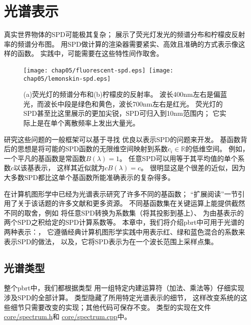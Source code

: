\section{光谱表示}\label{sec:光谱表示}

真实世界物体的SPD可能极其复杂；
展示了荧光灯发光的频谱分布和柠檬皮反射率的频谱分布图。
用SPD做计算的渲染器需要紧实、高效且准确的方式表示像这样的函数。
实践中，可能需要在这些特性间作取舍。
\begin{figure}[htbp]
    \centering
    \texttt{[image: chap05/fluorescent-spd.eps]}\,\nolinebreak
    \texttt{[image: chap05/lemonskin-spd.eps]}
    \caption{(a)荧光灯的频谱分布和(b)柠檬皮的反射率。
    波长400nm左右是偏蓝光，而波长中段是绿色和黄色，波长700nm左右是红光。
    荧光灯的SPD甚至比这里展示的更加尖锐，SPD可归入到10nm范围内；
    它实际上是在单个离散频率上发出大量光。}
    \label{fig:5.1}
\end{figure}

研究这些问题的一般框架可以基于寻找
优良以表示SPD的问题来开发。
基函数背后的思想是将可能的SPD函数的无限维空间映射到系数$c_i\in\mathbb{R}$的低维空间。
例如，一个平凡的基函数是常函数$B(\lambda)=1$。
任意SPD可以用等于其平均值的单个系数$c$以该基表示，
这样其近似就为$cB(\lambda)=c$。
很明显这是个很差的近似，因为大多数SPD都比这单个基函数所能准确表示的复杂得多。

在计算机图形学中已经为光谱表示研究了许多不同的基函数；
“扩展阅读”一节引用了关于该话题的许多文献和更多资源。
不同基函数集在关键运算上能提供截然不同的取舍，例如
将任意SPD转换为系数集（将其投影到基上）、
为由基表示的两个SPD之积给定的SPD计算系数等。
本章中，我们将介绍pbrt中可用于光谱的两种表示：，
它遵循经典计算机图形学实践中用表示红、绿和蓝色混合的系数来表示SPD的做法，
以及，它将SPD表示为在一个波长范围上采样点集。

\subsection{光谱类型}\label{sub:光谱类型}
整个pbrt中，我们都根据类型
用一组特定内建运算符（加法、乘法等）仔细实现涉及SPD的全部计算。
类型隐藏了所用特定光谱表示的细节，
这样改变系统的这些细节只需要改变的实现；其他代码可保存不变。
类型的实现在文件\href{https://github.com/mmp/pbrt-v3/blob/master/src/core/spectrum.h}{\ttfamily core/spectrum.h}和
\href{https://github.com/mmp/pbrt-v3/blob/master/src/core/spectrum.cpp}{\ttfamily core/spectrum.cpp}中。

